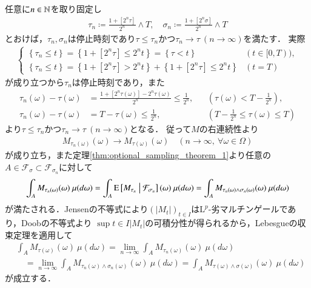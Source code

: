 	\begin{prf}
		任意に$n \in \mathbb{N}$を取り固定し
		\begin{align}
			\tau_n \coloneqq \frac{1+[2^n \tau]}{2^n} \wedge T,
			\quad \sigma_n \coloneqq \frac{1+[2^n \sigma]}{2^n} \wedge T
		\end{align}
		とおけば，$\tau_n,\sigma_n$は停止時刻であり$\tau \leq \tau_n$かつ$\tau_n \longrightarrow \tau\ (n \longrightarrow \infty)$を満たす．
		実際
		\begin{align}
			\begin{cases}
				\left\{ \tau_n \leq t \right\} = \left\{ 1 + [2^n \tau] \leq 2^n t \right\} = \left\{ \tau < t \right\} & (t \in [0,T)), \\
				\left\{ \tau_n \leq t \right\} = \left\{ 1 + [2^n \tau] > 2^n t \right\} + \left\{ 1 + [2^n \tau] \leq 2^n t \right\} & (t = T)
			\end{cases}
		\end{align}
		が成り立つから$\tau_n$は停止時刻であり，また
		\begin{align}
				\tau_n(\omega) - \tau(\omega) &= \frac{1 + [2^n \tau(\omega)] - 2^n \tau(\omega)}{2^n} \leq \frac{1}{2^n}, && \left( \tau(\omega) < T - \frac{1}{2^n} \right), \\
				\tau_n(\omega) - \tau(\omega) &= T - \tau(\omega) \leq \frac{1}{2^n}, && \left( T - \frac{1}{2^n} \leq \tau(\omega) \leq T \right)
		\end{align}
		より$\tau \leq \tau_n$かつ$\tau_n \longrightarrow \tau\ (n \longrightarrow \infty)$となる．
		従って$M$の右連続性より
		\begin{align}
			M_{\tau_n(\omega)}(\omega) \longrightarrow M_{\tau(\omega)}(\omega)
			\quad (n \longrightarrow \infty,\ \forall \omega \in \Omega)
		\end{align}
		が成り立ち，また定理\ref{thm:optional_sampling_theorem_1}より任意の$A \in \mathcal{F}_\sigma \subset \mathcal{F}_{\sigma_n}$に対して
		\begin{align}
			\int_A M_{\tau_n(\omega)}(\omega)\ \mu(d\omega) 
			= \int_A \cexp{M_{\tau_n}}{\mathcal{F}_{\sigma_n}}(\omega)\ \mu(d\omega) 
			= \int_A M_{\tau_n(\omega)\wedge \sigma_n(\omega)}(\omega)\ \mu(d\omega) 
		\end{align}
		が満たされる．Jensenの不等式により$(|M_t|)_{t \in I}$は$\mathrm{L}^p$-劣マルチンゲールであり，Doobの不等式より
		$\sup{t \in I}{|M_t|}$の可積分性が得られるから，Lebesgueの収束定理を適用して
		\begin{align}
			&\int_A M_{\tau(\omega)}(\omega)\ \mu(d\omega) = \lim_{n \to \infty} \int_A M_{\tau_n(\omega)}(\omega)\ \mu(d\omega) \\
			&\quad = \lim_{n \to \infty} \int_A M_{\tau_n(\omega)\wedge \sigma_n(\omega)}(\omega)\ \mu(d\omega)
			= \int_A M_{\tau(\omega)\wedge \sigma(\omega)}(\omega)\ \mu(d\omega)
		\end{align}
		が成立する．
		\QED
	\end{prf}
	